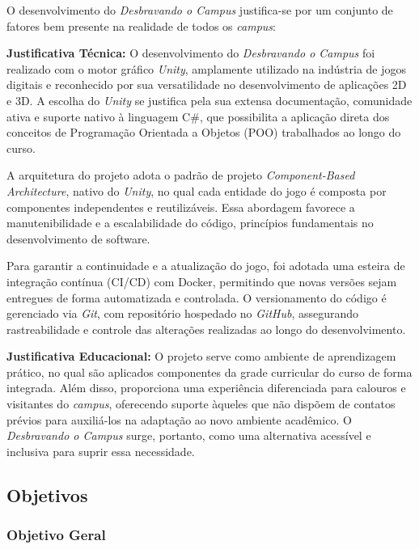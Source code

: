\documentclass[12pt, a4paper]{article}
\begin{document}
O desenvolvimento do \textit{Desbravando o Campus} justifica-se por um conjunto de fatores
bem presente na realidade de todos os \textit{campus}:

\bigbreak

{\bfseries Justificativa Técnica:} O desenvolvimento do \textit{Desbravando o Campus} foi realizado com o motor gráfico
\textit{Unity}, amplamente utilizado na indústria de jogos digitais e reconhecido por
sua versatilidade no desenvolvimento de aplicações 2D e 3D. A escolha do \textit{Unity}
se justifica pela sua extensa documentação, comunidade ativa e suporte nativo à linguagem
C\#, que possibilita a aplicação direta dos conceitos de Programação Orientada a Objetos
(POO) trabalhados ao longo do curso.

A arquitetura do projeto adota o padrão de projeto \textit{Component-Based Architecture},
nativo do \textit{Unity}, no qual cada entidade do jogo é composta por componentes
independentes e reutilizáveis. Essa abordagem favorece a manutenibilidade e a escalabilidade
do código, princípios fundamentais no desenvolvimento de software.

Para garantir a continuidade e a atualização do jogo, foi adotada uma esteira de
integração contínua (CI/CD) com Docker, permitindo que novas versões sejam entregues
de forma automatizada e controlada. O versionamento do código é gerenciado via
\textit{Git}, com repositório hospedado no \textit{GitHub}, assegurando rastreabilidade
e controle das alterações realizadas ao longo do desenvolvimento.

\bigbreak

{\bfseries Justificativa Educacional:} O projeto serve como ambiente de aprendizagem
prático, no qual são aplicados componentes da grade curricular do curso de forma
integrada. Além disso, proporciona uma experiência diferenciada para calouros e
visitantes do \textit{campus}, oferecendo suporte àqueles que não dispõem de contatos
prévios para auxiliá-los na adaptação ao novo ambiente acadêmico. O
\textit{Desbravando o Campus} surge, portanto, como uma alternativa acessível e
inclusiva para suprir essa necessidade.

\subsection{Objetivos}

\subsubsection{Objetivo Geral}
\end{document}

